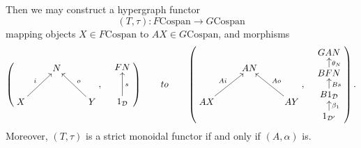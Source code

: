 \begin{theorem}
  Then we may construct a hypergraph functor 
  \[
    (T, \tau)\colon  F\mathrm{Cospan} \longrightarrow G\mathrm{Cospan}
  \]
  mapping objects $X \in F\mathrm{Cospan}$ to $AX \in G\mathrm{Cospan}$, and
  morphisms 
  \[
    \left(
    \begin{aligned}
      \xymatrix{
	& N \\  
	X \ar[ur]^{i} && Y \ar[ul]_{o}
      }
    \end{aligned}
    ,
    \quad
    \begin{aligned}
      \xymatrix{
	FN \\
	1_{\mathcal D} \ar[u]_{s}
      }
    \end{aligned}
    \right)
    \qquad
  to
  \qquad
    \left(
    \begin{aligned}
      \xymatrix{
	& AN \\  
	AX \ar[ur]^{Ai} && AY \ar[ul]_{Ao}
      }
    \end{aligned}
    ,
    \quad
    \begin{aligned}
      \xymatrixrowsep{.8pc}
      \xymatrix{
	GAN \\
	BFN \ar[u]_{\theta_N}\\
	B1_{\mathcal D} \ar[u]_{Bs} \\
	1_{\mathcal D'} \ar[u]_{\beta_1}
      }
    \end{aligned}
    \right).
  \]
  Moreover, $(T,\tau)$ is a strict monoidal functor if and only if $(A,\alpha)$
  is.
\end{theorem}


